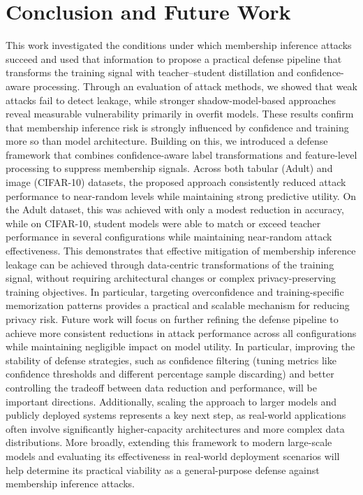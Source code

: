\documentclass[conference]{IEEEtran}
\begin{document}
\section{Conclusion and Future Work}
This work investigated the conditions under which membership inference attacks succeed and used that information to propose a practical defense pipeline that transforms the training signal with teacher--student distillation and confidence-aware processing. Through an evaluation of attack methods, we showed that weak attacks fail to detect leakage, while stronger shadow-model-based approaches reveal measurable vulnerability primarily in overfit models. These results confirm that membership inference risk is strongly influenced by confidence and training more so than model architecture.
Building on this, we introduced a defense framework that combines confidence-aware label transformations and feature-level processing to suppress membership signals. Across both tabular (Adult) and image (CIFAR-10) datasets, the proposed approach consistently reduced attack performance to near-random levels while maintaining strong predictive utility. On the Adult dataset, this was achieved with only a modest reduction in accuracy, while on CIFAR-10, student models were able to match or exceed teacher performance in several configurations while maintaining near-random attack effectiveness.
This demonstrates that effective mitigation of membership inference leakage can be achieved through data-centric transformations of the training signal, without requiring architectural changes or complex privacy-preserving training objectives. In particular, targeting overconfidence and training-specific memorization patterns provides a practical and scalable mechanism for reducing privacy risk.
Future work will focus on further refining the defense pipeline to achieve more consistent reductions in attack performance across all configurations while maintaining negligible impact on model utility. In particular, improving the stability of defense strategies, such as confidence filtering (tuning metrics like confidence thresholds and different percentage sample discarding) and better controlling the tradeoff between data reduction and performance, will be important directions. Additionally, scaling the approach to larger models and publicly deployed systems represents a key next step, as real-world applications often involve significantly higher-capacity architectures and more complex data distributions.
More broadly, extending this framework to modern large-scale models and evaluating its effectiveness in real-world deployment scenarios will help determine its practical viability as a general-purpose defense against membership inference attacks.
\end{document}
